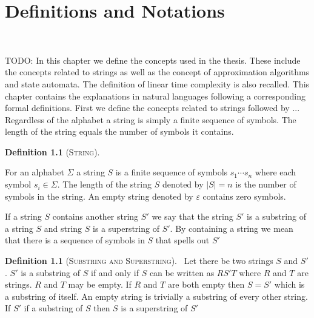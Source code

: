 \documentclass[english,twoside,censored,csm,algorithms-track-2020]{HYthesisML}
\theoremstyle{plain}
\theoremstyle{definition}
\newtheorem{definition}[theorem]{Definition}
\begin{document}

\chapter{Definitions and Notations}~\label{chp-preli}









TODO:
In this chapter we define the concepts used in the thesis. These include the concepts related to
strings as well as the concept of approximation algorithms and state automata. The definition of
linear time complexity is also recalled. This chapter contains the explanations in natural
languages following a corresponding formal definitions. First we define the concepts related
to strings followed by ...  \\[1in]



Regardless of the alphabet a string is simply a finite sequence of symbols. The length of the string equals the number of symbols it contains. 

\begin{definition}[\textsc{String}]~\label{def-string}
  
  For an alphabet $\Sigma$ a string $S$ is a finite sequence of symbols  ${s_1\cdots s_n}$ where each symbol $s_i \in \Sigma$.
  The length of the string $S$ denoted by $|S| = n$ is the number of symbols in the string.
  An empty string denoted by $\varepsilon$ contains zero symbols.
  
\end{definition}

If a string $S$ contains another string $S'$ we say that the string $S'$ is a substring of a string $S$ and string $S$ is a superstring of $S'$.
By containing a string we mean that there is a sequence of symbols in $S$ that spells out $S'$

\begin{definition}[\textsc{Substring and Superstring}]~\label{def-sub-super}
  Let there be two strings $S$ and $S'$.
  $S'$ is a substring of $S$ if and only if $S$ can be written as $RS'T$ where $R$ and $T$ are strings. $R$ and $T$ may be empty.
  If $R$ and $T$ are both empty then $S = S'$ which is a substring of itself.
  An empty string is trivially a substring of every other string.\\

  If $S'$ if a substring of $S$ then $S$ is a superstring of $S'$
\end{definition}
\end{document}

